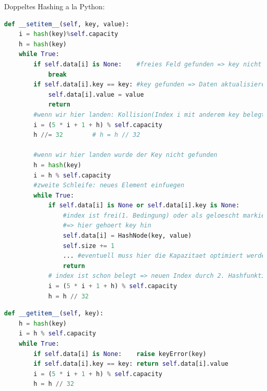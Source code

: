 \documentclass[11pt, fleqn]{scrreprt}
\begin{document}
Doppeltes Hashing a la Python:
\begin{lstlisting}[language=Python]
def __setitem__(self, key, value):
	i = hash(key)%self.capacity
	h = hash(key)
	while True:
		if self.data[i] is None:	#freies Feld gefunden => key nicht vorhanden
			break
		if self.data[i].key == key: #key gefunden => Daten aktualisieren
			self.data[i].value = value
			return
		#wenn wir hier landen: Kollision(Index i mit anderem key belegt)
		i = (5 * i + 1 + h) % self.capacity
		h //= 32        # h = h // 32
		
		#wenn wir hier landen wurde der Key nicht gefunden
		h = hash(key)
		i = h % self.capacity
		#zweite Schleife: neues Element einfuegen
		while True:
			if self.data[i] is None or self.data[i].key is None:
				#index ist frei(1. Bedingung) oder als geloescht markiert(2. Bedingung)
				#=> hier gehoert key hin
				self.data[i] = HashNode(key, value)
				self.size += 1
				... #eventuell muss hier die Kapazitaet optimiert werden
				return
			# index ist schon belegt => neuen Index durch 2. Hashfunktion berechnen
			i = (5 * i + 1 + h) % self.capacity
			h = h // 32
\end{lstlisting}

\begin{lstlisting}[language=Python]
def __getitem__(self, key):
	h = hash(key)
	i = h % self.capacity
	while True:
		if self.data[i] is None:    raise keyError(key)
		if self.data[i].key == key: return self.data[i].value
		i = (5 * i + 1 + h) % self.capacity
		h = h // 32
\end{lstlisting}
\end{document}
